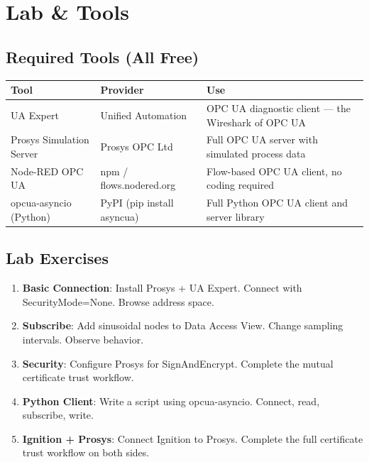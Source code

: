 \documentclass[12pt,twoside,openright]{memoir}
\begin{document}
\chapter{Lab \& Tools}

\section{Required Tools (All Free)}

\begin{tabularx}{\textwidth}{llX}
\toprule
\textbf{Tool} & \textbf{Provider} & \textbf{Use} \\
\midrule
\rowcolor{rowlight} UA Expert & Unified Automation & OPC UA diagnostic client --- the Wireshark of OPC UA \\
Prosys Simulation Server & Prosys OPC Ltd & Full OPC UA server with simulated process data \\
\rowcolor{rowlight} Node-RED OPC UA & npm / flows.nodered.org & Flow-based OPC UA client, no coding required \\
opcua-asyncio (Python) & PyPI (pip install asyncua) & Full Python OPC UA client and server library \\
\bottomrule
\end{tabularx}

\section{Lab Exercises}

\begin{enumerate}
  \item \textbf{Basic Connection}: Install Prosys + UA Expert. Connect with SecurityMode=None. Browse address space.
  \item \textbf{Subscribe}: Add sinusoidal nodes to Data Access View. Change sampling intervals. Observe behavior.
  \item \textbf{Security}: Configure Prosys for SignAndEncrypt. Complete the mutual certificate trust workflow.
  \item \textbf{Python Client}: Write a script using opcua-asyncio. Connect, read, subscribe, write.
  \item \textbf{Ignition + Prosys}: Connect Ignition to Prosys. Complete the full certificate trust workflow on both sides.
\end{enumerate}
\end{document}
